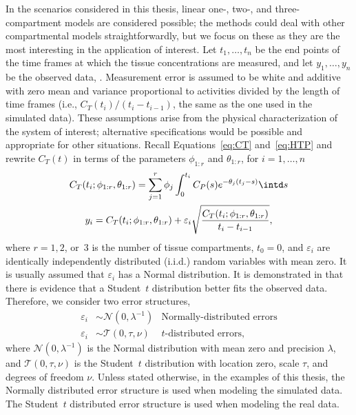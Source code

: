 In the scenarios considered in this thesis, linear one-, two-, and three-compartment models are considered possible; the methods could deal with other compartmental models straightforwardly, but we focus on these as they are the most interesting in the application of interest. Let $t_1, \dots, t_n$ be the end points of the time frames at which the tissue concentrations are measured, and let $y_1,\dots,y_n$ be the observed data, . Measurement error is assumed to be white and additive with zero mean and variance proportional to activities divided by the length of time frames (i.e., $C_T(t_i)/(t_i - t_{i-1})$, the same as the one used in the simulated data). These assumptions arise from the physical characterization of the \pet system of interest; alternative specifications would be possible and appropriate for other situations. Recall Equations~\eqref{eq:CT} and~\eqref{eq:HTP} and rewrite $C_T(t)$ in terms of the parameters $\phi_{1:r}$ and $\theta_{1:r}$, for $i = 1,\dots,n$
\begin{gather*}
  C_T(t_i;\phi_{1:r},\theta_{1:r}) =
  \sum_{j=1}^r \phi_j\int_0^{t_i}C_P(s)e^{-\theta_j(t_j-s)} \intd s \\
  y_i = C_T(t_i;\phi_{1:r},\theta_{1:r}) +
  \varepsilon_i\sqrt{\frac{C_T(t_i;\phi_{1:r},\theta_{1:r})} {t_i - t_{i-1}}},
\end{gather*}
where $r = 1, 2$, or~$3$ is the number of tissue compartments, $t_0 = 0$, and $\varepsilon_i$ are identically independently distributed (i.i.d.) random variables with mean zero. It is usually assumed that $\varepsilon_i$ has a Normal distribution. It is demonstrated in \cite{Zhou2013} that there is evidence that a Student~$t$ distribution better fits the observed data. Therefore, we consider two error structures,
\begin{align*}
  \varepsilon_i &\sim \mathcal{N}(0,\lambda^{-1})
  &\text{Normally-distributed errors} \\
  \varepsilon_i &\sim \mathcal{T}(0,\tau,\nu)
  &\text{$t$-distributed errors},
\end{align*}
where $\mathcal{N}(0,\lambda^{-1})$ is the Normal distribution with mean zero and precision $\lambda$, and $\mathcal{T}(0,\tau,\nu)$ is the Student~$t$ distribution with location zero, scale $\tau$, and degrees of freedom $\nu$. Unless stated otherwise, in the examples of this thesis, the Normally distributed error structure is used when modeling the simulated data. The Student~$t$ distributed error structure is used when modeling the real data.
